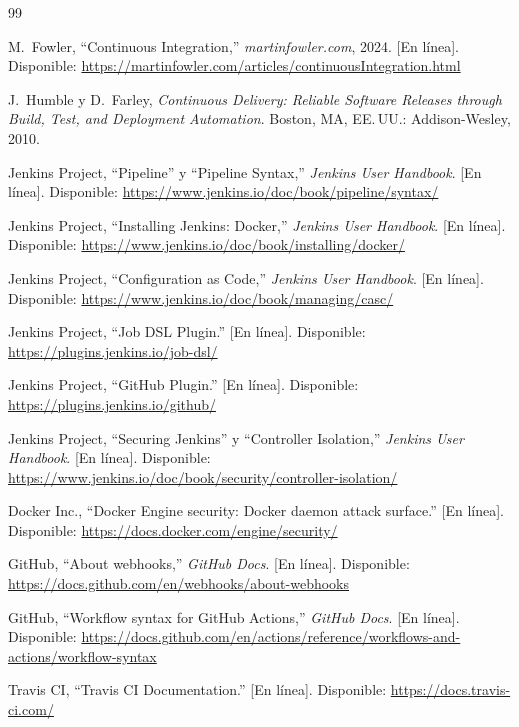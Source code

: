 \documentclass[11pt,a4paper]{article}
\begin{document}
\begin{thebibliography}{99}

 M.~Fowler, ``Continuous Integration,'' \emph{martinfowler.com}, 2024.
  [En línea]. Disponible: \url{https://martinfowler.com/articles/continuousIntegration.html}

 J.~Humble y D.~Farley, \emph{Continuous Delivery: Reliable Software Releases
  through Build, Test, and Deployment Automation}. Boston, MA, EE.\,UU.: Addison-Wesley, 2010.

 Jenkins Project, ``Pipeline'' y ``Pipeline Syntax,'' \emph{Jenkins User
  Handbook}. [En línea]. Disponible: \url{https://www.jenkins.io/doc/book/pipeline/syntax/}

 Jenkins Project, ``Installing Jenkins: Docker,'' \emph{Jenkins User
  Handbook}. [En línea]. Disponible: \url{https://www.jenkins.io/doc/book/installing/docker/}

 Jenkins Project, ``Configuration as Code,'' \emph{Jenkins User Handbook}.
  [En línea]. Disponible: \url{https://www.jenkins.io/doc/book/managing/casc/}

 Jenkins Project, ``Job DSL Plugin.'' [En línea]. Disponible:
  \url{https://plugins.jenkins.io/job-dsl/}

 Jenkins Project, ``GitHub Plugin.'' [En línea]. Disponible:
  \url{https://plugins.jenkins.io/github/}

 Jenkins Project, ``Securing Jenkins'' y ``Controller Isolation,''
  \emph{Jenkins User Handbook}. [En línea]. Disponible:
  \url{https://www.jenkins.io/doc/book/security/controller-isolation/}

 Docker Inc., ``Docker Engine security: Docker daemon attack surface.''
  [En línea]. Disponible: \url{https://docs.docker.com/engine/security/}

 GitHub, ``About webhooks,'' \emph{GitHub Docs}. [En línea]. Disponible:
  \url{https://docs.github.com/en/webhooks/about-webhooks}

 GitHub, ``Workflow syntax for GitHub Actions,'' \emph{GitHub Docs}.
  [En línea]. Disponible:
  \url{https://docs.github.com/en/actions/reference/workflows-and-actions/workflow-syntax}

 Travis CI, ``Travis CI Documentation.'' [En línea]. Disponible:
  \url{https://docs.travis-ci.com/}

\end{thebibliography}
\end{document}
